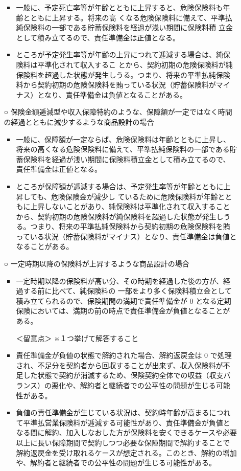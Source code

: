 \documentclass[report,gutter=10mm,fore-edge=10mm,uplatex,dvipdfmx]{jlreq}
\begin{document}
\begin{itemize}
\begin{itemize}
\begin{itemize}
  \item 一般に、予定死亡率等が年齢とともに上昇すると、危険保険料も年齢とともに上昇する。将来の高 くなる危険保険料に備えて、平準払純保険料の一部である貯蓄保険料を経過が浅い期間に保険料積 立金として積み立てるので、責任準備金は正値となる。
 \item ところが予定発生率等が年齢の上昇につれて逓減する場合は、純保険料は平準化されて収入するこ とから、契約初期の危険保険料が純保険料を超過した状態が発生しうる。つまり、将来の平準払純保険料から契約初期の危険保険料を賄っている状況（貯蓄保険料がマイナス）となり、責任準備金は負値となることがある。
\end{itemize} 
\item  [○]保険金額逓減型や収入保障特約のような、保障額が一定ではなく時間の経過とともに減少するような商品設計の場合
\begin{itemize}
  \item 一般に、保障額が一定ならば、危険保険料は年齢とともに上昇し、将来の高くなる危険保険料に備えて、平準払純保険料の一部である貯蓄保険料を経過が浅い期間に保険料積立金として積み立てるので、責任準備金は正値となる。
 \item  ところが保障額が逓減する場合は、予定発生率等が年齢とともに上昇しても、危険保険金が減少し ているために危険保険料が年齢とともに上昇しないことがあり、純保険料は平準化されて収入することから、契約初期の危険保険料が純保険料を超過した状態が発生しうる。つまり、将来の平準払純保険料から契約初期の危険保険料を賄っている状況（貯蓄保険料がマイナス）となり、責任準備金は負値となることがある。
\end{itemize} 
\item  [○]一定時期以降の保険料が上昇するような商品設計の場合
\begin{itemize}
  \item  一定時期以降の保険料が高い分、その時期を経過した後の方が、経過する前に比べて、純保険料の 一部をより多く保険料積立金として積み立てられるので、保険期間の満期で責任準備金が 0 となる定期保険においては、満期の前の時点で責任準備金が負値となることがある。
 \item  [＜留意点＞]※１つ挙げて解答すること
 \item  責任準備金が負値の状態で解約された場合、解約返戻金は 0 で処理され、不足分を契約者から回収することが出来ず、収入保険料が不足した状態で契約が消滅するため、保険契約全体での収益（収支バランス）の悪化や、解約者と継続者での公平性の問題が生じる可能性がある。
 \item 負値の責任準備金が生じている状況は、契約時年齢が高まるにつれて平準払営業保険料が逓減する可能性があり、責任準備金が負値となる間に解約、加入しなおした方が保険料を安くできるケースや必要以上に長い保障期間で契約しつつ必要な保障期間で解約することで解約返戻金を受け取れるケースが想定される。このとき、解約の増加や、解約者と継続者での公平性の問題が生じる可能性がある。
\end{itemize}
\end{itemize}
\end{itemize}
\end{document}
